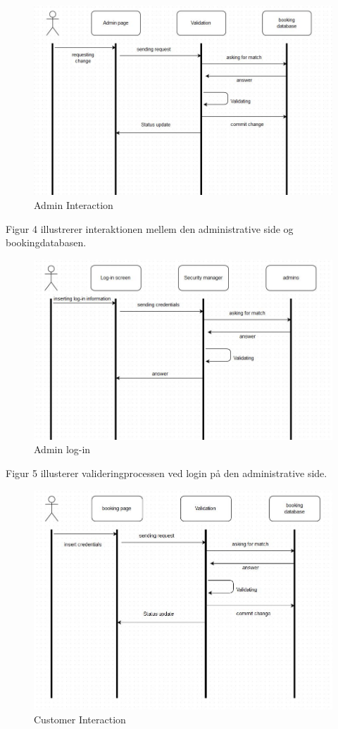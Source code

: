 \documentclass[12pt,a4paper]{article}
\begin{document}
\begin{figure}[H]
\centering
\includegraphics[scale=0.6]{adminInteraction.jpg}
\caption{Admin Interaction}
\end{figure}
Figur 4 illustrerer interaktionen mellem den administrative side og bookingdatabasen.\\
\begin{figure}[H]
\centering
\includegraphics[scale=0.6]{adminLog-in.jpg}
\caption{Admin log-in}
\end{figure}
Figur 5 illusterer valideringprocessen ved login på den administrative side.\\
\begin{figure}[H]
\centering
\includegraphics[scale=0.6]{customerLog-in.jpg}
\caption{Customer Interaction}
\end{figure}
\end{document}

